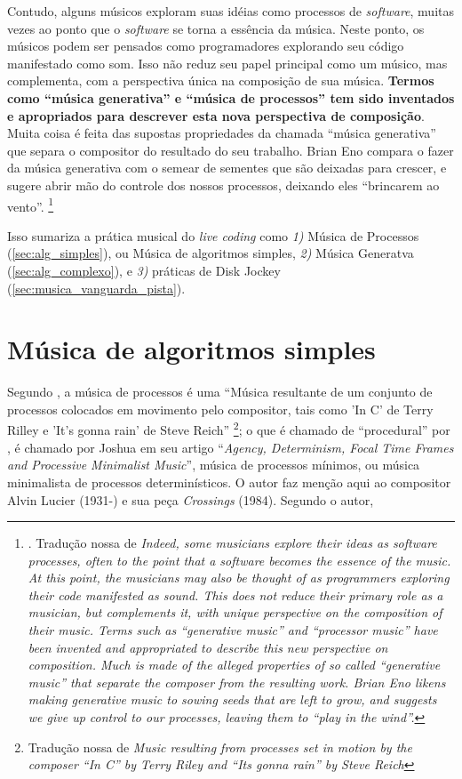 \begin{citacao}
Contudo, alguns músicos exploram suas idéias como processos de \emph{software}, muitas vezes ao ponto que o \emph{software} se torna a essência da música. Neste ponto, os músicos podem ser pensados como programadores explorando seu código manifestado como som. Isso não reduz seu papel principal como um músico, mas complementa, com a perspectiva única na composição de sua música. \textbf{Termos como ``música generativa'' e ``música de processos'' tem sido inventados e apropriados para descrever esta nova perspectiva de composição}. Muita coisa é feita das supostas propriedades da chamada ``música generativa'' que separa o compositor do resultado do seu trabalho. Brian Eno compara o fazer da música generativa com o semear de sementes que são deixadas para crescer, e sugere abrir mão do controle dos nossos processos, deixando eles ``brincarem ao vento''. \footnote{. Tradução nossa de \emph{Indeed, some musicians explore their ideas as software processes, often to the point that a software becomes the essence of the music. At this point, the musicians may also be thought of as programmers exploring their code manifested as sound. This does not reduce their primary role as a musician, but complements it, with unique perspective on the composition of their music. Terms such as “generative music” and “processor music” have been invented and appropriated to describe this new perspective on composition. Much is made of the alleged properties of so called “generative music” that separate the composer from the resulting work. Brian Eno likens making generative music to sowing seeds that are left to grow, and suggests we give up control to our processes, leaving them to “play in the wind”.}}
\end{citacao}

Isso sumariza a prática musical do \emph{live coding} como \emph{1)} Música de Processos (\autoref{sec:alg_simples}), ou Música de algoritmos simples, \emph{2)} Música Generatva (\autoref{sec:alg_complexo}), e \emph{3)} práticas de Disk Jockey (\autoref{sec:musica_vanguarda_pista}).

\section{Música de algoritmos simples}\label{sec:alg_simples}

Segundo , a música de processos é uma ``Música resultante de um conjunto de processos colocados em movimento pelo compositor, tais como  'In C' de Terry Rilley e 'It's gonna rain' de Steve Reich'' \footnote{Tradução nossa de \emph{Music resulting from processes set in motion by the composer “In C” by Terry Riley and “Its gonna rain” by Steve Reich}}; o que é chamado de ``procedural'' por , é chamado por Joshua  em seu artigo ``\emph{Agency, Determinism, Focal Time Frames and Processive Minimalist Music}'', música de processos mínimos, ou música minimalista de processos determinísticos. O autor faz menção aqui ao compositor Alvin Lucier (1931-) e sua peça \emph{Crossings} (1984). Segundo o autor,

